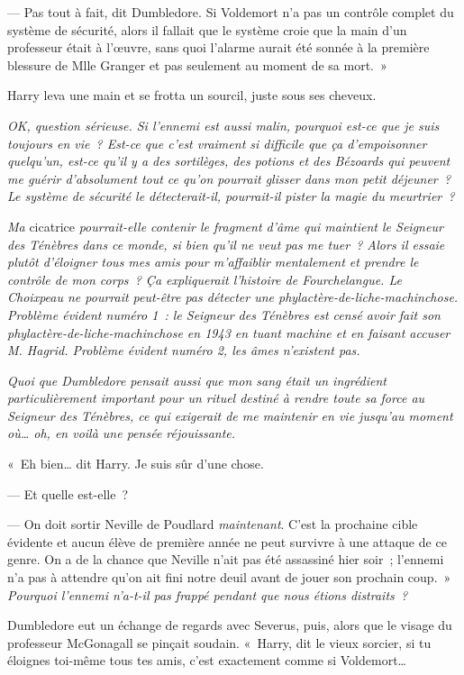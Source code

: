 --- Pas tout à fait, dit Dumbledore. Si Voldemort n'a pas un contrôle complet du système de sécurité, alors il fallait que le système croie que la main d'un professeur était à l'œuvre, sans quoi l'alarme aurait été sonnée à la première blessure de Mlle Granger et pas seulement au moment de sa mort.~»

Harry leva une main et se frotta un sourcil, juste sous ses cheveux.

\emph{OK, question sérieuse. Si l'ennemi est aussi malin, pourquoi est-ce que je suis toujours en vie~? Est-ce que c'est vraiment si difficile que ça d'empoisonner quelqu'un, est-ce qu'il y a des sortilèges, des potions et des Bézoards qui peuvent me guérir d'absolument tout ce qu'on pourrait glisser dans mon petit déjeuner~? Le système de sécurité le détecterait-il, pourrait-il pister la magie du meurtrier~?}

\emph{Ma} cicatrice \emph{pourrait-elle contenir le fragment d'âme qui maintient le Seigneur des Ténèbres dans ce monde, si bien qu'il ne veut pas me tuer~? Alors il essaie plutôt d'éloigner tous mes amis pour m'affaiblir mentalement et prendre le contrôle de mon corps~? Ça expliquerait l'histoire de Fourchelangue. Le Choixpeau ne pourrait peut-être pas détecter une phylactère-de-liche-machinchose. Problème évident numéro 1~: le Seigneur des Ténèbres est censé avoir fait son phylactère-de-liche-machinchose en 1943 en tuant machine et en faisant accuser M. Hagrid. Problème évident numéro 2, les âmes n'existent pas.}

\emph{Quoi que Dumbledore pensait aussi que mon sang était un ingrédient particulièrement important pour un rituel destiné à rendre toute sa force au Seigneur des Ténèbres, ce qui exigerait de me maintenir en vie jusqu'au moment où… oh, en voilà une pensée réjouissante.}

«~Eh bien… dit Harry. Je suis sûr d'une chose.

--- Et quelle est-elle~?

--- On doit sortir Neville de Poudlard \emph{maintenant}. C'est la prochaine cible évidente et aucun élève de première année ne peut survivre à une attaque de ce genre. On a de la chance que Neville n'ait pas été assassiné hier soir~; l'ennemi n'a pas à attendre qu'on ait fini notre deuil avant de jouer son prochain coup.~» \emph{Pourquoi l'ennemi n'a-t-il pas frappé pendant que nous étions distraits~?}

Dumbledore eut un échange de regards avec Severus, puis, alors que le visage du professeur McGonagall se pinçait soudain. «~Harry, dit le vieux sorcier, si tu éloignes toi-même tous tes amis, c'est exactement comme si Voldemort…

